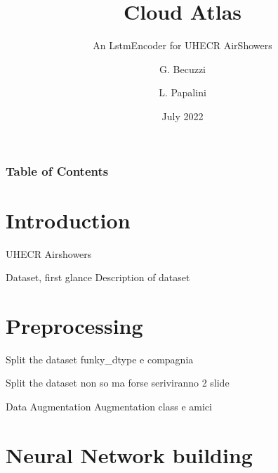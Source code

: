 \documentclass{beamer}
\title[Cloud Atlas] %
{Cloud Atlas}
\subtitle{An LstmEncoder for UHECR AirShowers}
\author[Gianluca Becuzzi, Lucia Papalini] %
{G. Becuzzi \and L. Papalini}
\date[July 2022] %
{July 2022}
\begin{document}
\frame{\titlepage}


\begin{frame}
\frametitle{Table of Contents}
\tableofcontents
\end{frame}


\section{Introduction}

\begin{frame}{UHECR Airshowers}


\end{frame}



\begin{frame}{Dataset, first glance}
    Description of dataset

\end{frame}


\section{Preprocessing}

\begin{frame}{Split the dataset}
    funky\_dtype e compagnia
\end{frame}

\begin{frame}{Split the dataset}
    non so ma forse seriviranno 2 slide
\end{frame}

\begin{frame}{Data Augmentation}
    Augmentation class e amici
    
\end{frame}



\section{Neural Network building}
\end{document}
